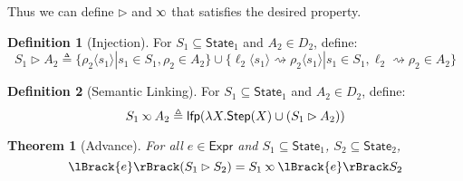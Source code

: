 \documentclass[acmsmall,review]{acmart}\settopmatter{printfolios=true,printccs=false,printacmref=false}
\theoremstyle{definition}
\newtheorem{defn}{Definition}[section]
\theoremstyle{plain}
\newtheorem{thm}{Theorem}[section]
\newcommand*{\Expr}{\mathsf{Expr}}
\newcommand*{\State}{\mathsf{State}}
\newcommand*{\lfp}{\mathsf{lfp}}
\newcommand*{\Step}{\mathsf{Step}}
\newcommand*{\semarrow}{\rightsquigarrow}
\newcommand*{\semlink}{\mathbin{\rotatebox[origin=c]{180}{$\propto$}}}
\newcommand*{\sembracket}[1]{\lBrack{#1}\rBrack}
\newcommand*{\inject}[2]{{#2}\langle{#1}\rangle}
\begin{document}
Thus we can define $\rhd$ and $\semlink$ that satisfies the desired property.
\begin{defn}[Injection]
  For $S_1\subseteq\State_1$ and $A_2\in D_2$, define:
  \[
    S_1\rhd A_2\triangleq\{\inject{s_1}{\rho_2}|s_1\in S_1,\rho_2\in A_2\}\cup\{\inject{s_1}{\ell_2}\semarrow\inject{s_1}{\rho_2}|s_1\in S_1,\ell_2\semarrow\rho_2\in A_2\}
  \]
\end{defn}
\begin{defn}[Semantic Linking]
  For $S_1\subseteq\State_1$ and $A_2\in D_2$, define:
  \[
    S_1\semlink A_2\triangleq\lfp(\lambda X.\Step(X)\cup(S_1\rhd A_2))
  \]
\end{defn}
\begin{thm}[Advance]
  For all $e\in\Expr$ and $S_1\subseteq\State_1$, $S_2\subseteq\State_2$,
  \[
    \sembracket{e}(S_1\rhd S_2)=S_1\semlink\sembracket{e}S_2
  \]
\end{thm}
\end{document}
